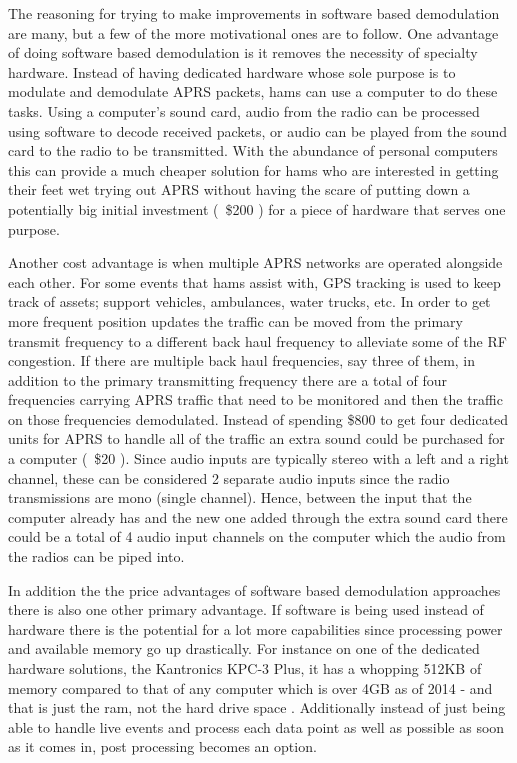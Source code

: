 The reasoning for trying to make improvements in software based demodulation are many, but a few of the more motivational ones are to follow. One advantage of doing software based demodulation is it removes the necessity of specialty hardware. Instead of having dedicated hardware whose sole purpose is to modulate and demodulate APRS packets, hams can use a computer to do these tasks. Using a computer's sound card, audio from the radio can be processed using software to decode received packets, or audio can be played from the sound card to the radio to be transmitted. With the abundance of personal computers this can provide a much cheaper solution for hams who are interested in getting their feet wet trying out APRS without having the scare of putting down a potentially big initial investment (~\$200 \cite{Kantronics2014,Outlet2014}) for a piece of hardware that serves one purpose.

Another cost advantage is when multiple APRS networks are operated alongside each other. For some events that hams assist with, GPS tracking is used to keep track of assets; support vehicles, ambulances, water trucks, etc. In order to get more frequent position updates the traffic can be moved from the primary transmit frequency to a different back haul frequency to alleviate some of the RF congestion. If there are multiple back haul frequencies, say three of them, in addition to the primary transmitting frequency there are a total of four frequencies carrying APRS traffic that need to be monitored and then the traffic on those frequencies demodulated. Instead of spending \$800 to get four dedicated units for APRS to handle all of the traffic an extra sound could be purchased for a computer (~\$20 \cite{Newegg}). Since audio inputs are typically stereo with a left and a right channel, these can be considered 2 separate audio inputs since the radio transmissions are mono (single channel). Hence, between the input that the computer already has and the new one added through the extra sound card there could be a total of 4 audio input channels on the computer which the audio from the radios can be piped into.

In addition the the price advantages of software based demodulation approaches there is also one other primary advantage. If software is being used instead of hardware there is the potential for a lot more capabilities since processing power and available memory go up drastically. For instance on one of the dedicated hardware solutions, the Kantronics KPC-3 Plus, it has a whopping 512KB of memory compared to that of any computer which is over 4GB as of 2014 - and that is just the ram, not the hard drive space \cite{Kantronics2014,Graham-Smith2014}. Additionally instead of just being able to handle live events and process each data point as well as possible as soon as it comes in, post processing becomes an option.

